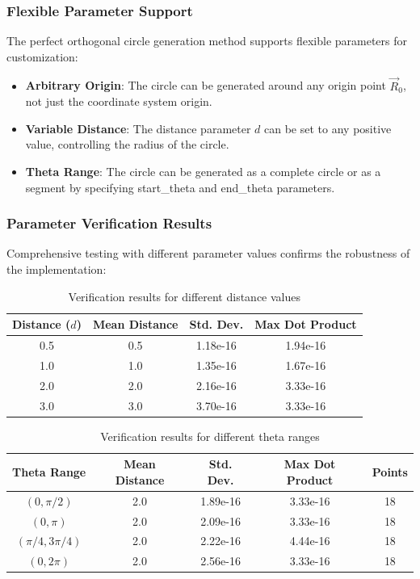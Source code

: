 \subsubsection{Flexible Parameter Support}

The perfect orthogonal circle generation method supports flexible parameters for customization:

\begin{itemize}
    \item \textbf{Arbitrary Origin}: The circle can be generated around any origin point $\vec{R}_0$, not just the coordinate system origin.
    \item \textbf{Variable Distance}: The distance parameter $d$ can be set to any positive value, controlling the radius of the circle.
    \item \textbf{Theta Range}: The circle can be generated as a complete circle or as a segment by specifying start\_theta and end\_theta parameters.
\end{itemize}

\subsubsection{Parameter Verification Results}

Comprehensive testing with different parameter values confirms the robustness of the implementation:

\begin{table}[H]
    \centering
    \begin{tabular}{|c|c|c|c|}
        \hline
        \textbf{Distance ($d$)} & \textbf{Mean Distance} & \textbf{Std. Dev.} & \textbf{Max Dot Product} \\ \hline
        0.5 & 0.5 & 1.18e-16 & 1.94e-16 \\ \hline
        1.0 & 1.0 & 1.35e-16 & 1.67e-16 \\ \hline
        2.0 & 2.0 & 2.16e-16 & 3.33e-16 \\ \hline
        3.0 & 3.0 & 3.70e-16 & 3.33e-16 \\ \hline
    \end{tabular}
    \caption{Verification results for different distance values}
    \label{tab:distance_verification}
\end{table}

\begin{table}[H]
    \centering
    \begin{tabular}{|c|c|c|c|c|}
        \hline
        \textbf{Theta Range} & \textbf{Mean Distance} & \textbf{Std. Dev.} & \textbf{Max Dot Product} & \textbf{Points} \\ \hline
        $(0, \pi/2)$ & 2.0 & 1.89e-16 & 3.33e-16 & 18 \\ \hline
        $(0, \pi)$ & 2.0 & 2.09e-16 & 3.33e-16 & 18 \\ \hline
        $(\pi/4, 3\pi/4)$ & 2.0 & 2.22e-16 & 4.44e-16 & 18 \\ \hline
        $(0, 2\pi)$ & 2.0 & 2.56e-16 & 3.33e-16 & 18 \\ \hline
    \end{tabular}
    \caption{Verification results for different theta ranges}
    \label{tab:theta_verification}
\end{table}

